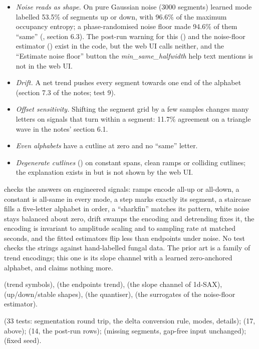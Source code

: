 \begin{itemize}
\item \emph{Noise reads as shape.} On pure Gaussian noise (3000 segments) learned mode
  labelled 53.5\% of segments up or down, with 96.6\% of the maximum occupancy entropy; a
  phase-randomised noise floor made 94.6\% of them ``same''
  (, section 6.3). The
  post-run warning for this () and the noise-floor estimator
  () exist in the code, but the web UI calls neither, and
  the ``Estimate noise floor'' button the \emph{min\_same\_halfwidth} help text mentions is
  not in the web UI.
\item \emph{Drift.} A net trend pushes every segment towards one end of the alphabet
  (section 7.3 of the notes; test 9).
\item \emph{Offset sensitivity.} Shifting the segment grid by a few samples changes many
  letters on signals that turn within a segment: 11.7\% agreement on a triangle wave in the
  notes' section 6.1.
\item \emph{Even alphabets} have a cutline at zero and no ``same'' letter.
\item \emph{Degenerate cutlines} () on constant spans, clean
  ramps or colliding cutlines; the explanation exists in  but
  is not shown by the web UI.
\end{itemize}

 checks the answers on engineered signals: ramps encode
all-up or all-down, a constant is all-same in every mode, a step marks exactly its segment,
a staircase fills a five-letter alphabet in order, a ``sharkfin'' matches its pattern, white
noise stays balanced about zero, drift swamps the encoding and detrending fixes it, the
encoding is invariant to amplitude scaling and to sampling rate at matched seconds, and the
fitted estimators flip less than endpoints under noise. No test checks the strings against
hand-labelled fungal data. The prior art is a family of trend encodings; this one is its
slope channel with a learned zero-anchored alphabet, and claims nothing more.

\citet{esmael2012multivariate} (trend symbols), \citet{sun2014improvement} (the endpoints
trend), \citet{malinowski2013onedsax} (the slope channel of 1d-SAX),
\citet{agrawal1995querying} (up/down/stable shapes), \citet{bountrogiannis2022distribution}
(the quantiser), \citet{theiler1992testing} (the surrogates of the noise-floor estimator).

 (33 tests: segmentation round trip, the delta conversion rule,
modes, details);  (17, above);
 (14, the post-run rows);
 (missing segments, gap-free input unchanged);
 (fixed seed).
